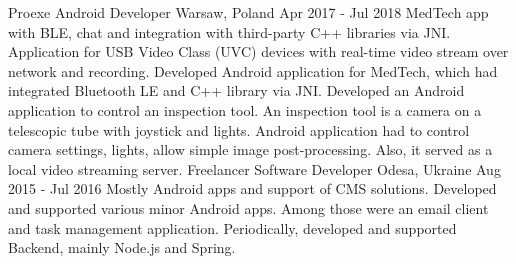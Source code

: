\cvexperience
  {Proexe}
  {Android Developer}
  {Warsaw, Poland}
  {Apr 2017 - Jul 2018}
  {
    MedTech app with BLE, chat and integration with third-party C++ libraries via JNI.
    \newline
    Application for USB Video Class (UVC) devices with real-time video stream over network and recording.
  }
  {
    Developed Android application for MedTech, which had integrated Bluetooth LE and C++ library via JNI.
    \newline
    Developed an Android application to control an inspection tool.
    An inspection tool is a camera on a telescopic tube with joystick and lights.
    Android application had to control camera settings, lights, allow simple image post-processing.
    Also, it served as a local video streaming server.
  }
\cvexperience
  {Freelancer}
  {Software Developer}
  {Odesa, Ukraine}
  {Aug 2015 - Jul 2016}
  {
    Mostly Android apps and support of CMS solutions.
  }
  {
    Developed and supported various minor Android apps. Among those were an email client and task management application.
    \newline
    Periodically, developed and supported Backend, mainly Node.js and Spring.
  }

